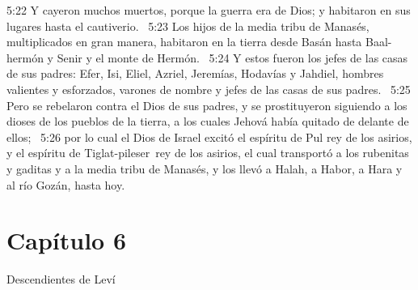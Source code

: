 5:22 Y cayeron muchos muertos, porque la guerra era de Dios; y habitaron en sus lugares hasta el cautiverio.  
5:23 Los hijos de la media tribu de Manasés, multiplicados en gran manera, habitaron en la tierra desde Basán hasta Baal- hermón y Senir y el monte de Hermón.  
5:24 Y estos fueron los jefes de las casas de sus padres: Efer, Isi, Eliel, Azriel, Jeremías, Hodavías y Jahdiel, hombres valientes y esforzados, varones de nombre y jefes de las casas de sus padres.  
5:25 Pero se rebelaron contra el Dios de sus padres, y se prostituyeron siguiendo a los dioses de los pueblos de la tierra, a los cuales Jehová había quitado de delante de ellos;  
5:26 por lo cual el Dios de Israel excitó el espíritu de Pul rey de los asirios, y el espíritu de Tiglat-pileser rey de los asirios, el cual transportó a los rubenitas y gaditas y a la media tribu de Manasés, y los llevó a Halah, a Habor, a Hara y al río Gozán, hasta hoy. 
\section*{Capítulo 6 }
Descendientes de Leví  

